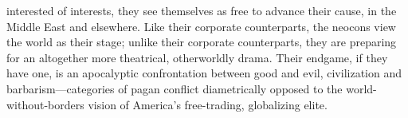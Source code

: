 interested of interests, they see themselves as free to advance their cause, in the Middle East and elsewhere. Like their corporate counterparts, the neocons view the world as their stage; unlike their corporate counterparts, they are preparing for an altogether more theatrical, otherworldly drama. Their endgame, if they have one, is an apocalyptic confrontation between good and evil, civilization and barbarism—categories of pagan conflict diametrically opposed to the world-without-borders vision of America’s free-trading, globalizing elite.{\par}